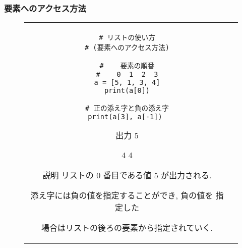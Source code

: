 \documentclass{jsarticle}
\begin{document}
\subsubsection{要素へのアクセス方法} \vspace{-5mm}
\begin{figure}[h]
	\begin{tabular}{cc}
		\begin{minipage}[t]{.4\textwidth}
			\begin{lstlisting}[caption=要素へのアクセス方法]
# リストの使い方
# (要素へのアクセス方法)

#    要素の順番
#    0  1  2  3
a = [5, 1, 3, 4]
print(a[0])

# 正の添え字と負の添え字
print(a[3], a[-1]) \end{lstlisting}
		\end{minipage} \hspace{5mm}
		\begin{minipage}[t]{.6\textwidth}
			\begin{minipage}[t]{.3\textwidth}
				\begin{itembox}[l]{出力}
					5 \par
					4 4 \par
				\end{itembox}
			\end{minipage}
			\begin{itembox}[l]{説明}
				リストの 0 番目である値 5 が出力される.  \par
				添え字には負の値を指定することができ,  負の値を
				指定した\par 場合はリストの後ろの要素から指定されていく.  \par
			\end{itembox}
		\end{minipage}
	\end{tabular}
\end{figure}
\end{document}
